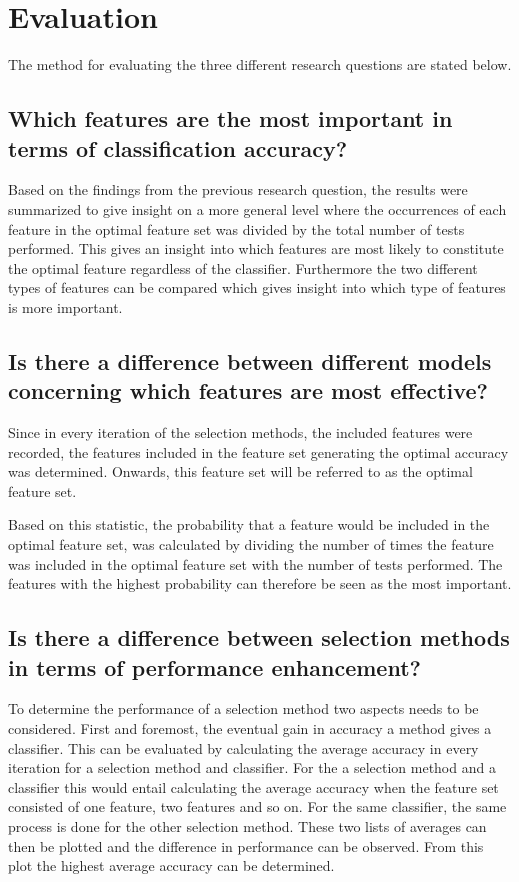 \documentclass{kththesis}
\begin{document}
\section{Evaluation}

The method for evaluating the three different research questions are stated below.

\subsection{Which features are the most important in terms of classification accuracy?}
Based on the findings from the previous research question, the results were summarized to give insight on a more general level where the occurrences of each feature in the optimal feature set was divided by the total number of tests performed. This gives an insight into which features are most likely to constitute the optimal feature regardless of the classifier. Furthermore the two different types of features can be compared which gives insight into which type of features is more important.

\subsection{Is there a difference between different models concerning which features are most effective?}
Since in every iteration of the selection methods, the included features were recorded, the features included in the feature set generating the optimal accuracy was determined. Onwards, this feature set will be referred to as the optimal feature set. 

Based on this statistic, the probability that a feature would be included in the optimal feature set, was calculated by dividing the number of times the feature was included in the optimal feature set with the number of tests performed. The features with the highest probability can therefore be seen as the most important.


\subsection{Is there a difference between selection methods in terms of performance enhancement?}

To determine the performance of a selection method two aspects needs to be considered. First and foremost, the eventual gain in accuracy a method gives a classifier. This can be evaluated by calculating the average accuracy in every iteration for a selection method and classifier. For the a selection method and a classifier this would entail calculating the average accuracy when the feature set consisted of one feature, two features and so on. For the same classifier, the same process is done for the other selection method. These two lists of averages can then be plotted and the difference in performance can be observed. From this plot the highest average accuracy can be determined. 
\end{document}
